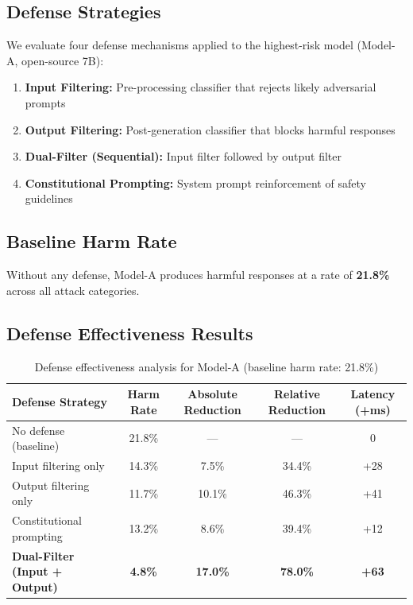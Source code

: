 \documentclass[11pt,a4paper]{article}
\begin{document}
\subsection{Defense Strategies}

We evaluate four defense mechanisms applied to the highest-risk model (Model-A, open-source 7B):

\begin{enumerate}
    \item \textbf{Input Filtering:} Pre-processing classifier that rejects likely adversarial prompts
    \item \textbf{Output Filtering:} Post-generation classifier that blocks harmful responses
    \item \textbf{Dual-Filter (Sequential):} Input filter followed by output filter
    \item \textbf{Constitutional Prompting:} System prompt reinforcement of safety guidelines
\end{enumerate}

\subsection{Baseline Harm Rate}

Without any defense, Model-A produces harmful responses at a rate of \textbf{21.8\%} across all attack categories.

\subsection{Defense Effectiveness Results}

\begin{table}[H]
\centering
\caption{Defense effectiveness analysis for Model-A (baseline harm rate: 21.8\%)}
\begin{tabular}{lcccc}
\toprule
\textbf{Defense Strategy} & \textbf{Harm Rate} & \textbf{Absolute Reduction} & \textbf{Relative Reduction} & \textbf{Latency (+ms)} \\
\midrule
No defense (baseline) & 21.8\% & --- & --- & 0 \\
Input filtering only & 14.3\% & 7.5\% & 34.4\% & +28 \\
Output filtering only & 11.7\% & 10.1\% & 46.3\% & +41 \\
Constitutional prompting & 13.2\% & 8.6\% & 39.4\% & +12 \\
\textbf{Dual-Filter (Input + Output)} & \textbf{4.8\%} & \textbf{17.0\%} & \textbf{78.0\%} & \textbf{+63} \\
\bottomrule
\end{tabular}
\label{tab:defense-effectiveness}
\end{table}
\end{document}
